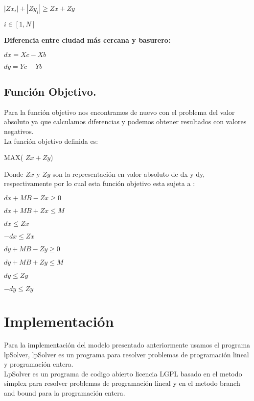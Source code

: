 \documentclass[10pt]{article}
\begin{document}
\begin{center}

 
  $ |Zx_i| + |Zy_i| \geq Zx + Zy $
  
   
   $i \in [1,N]$
  
  

\end{center}


\textbf{Diferencia entre ciudad  m\'as cercana y basurero: }\\

\begin{center}

 
  $ dx = Xc - Xb $
  
   
   $dy = Yc - Yb$
  
  

\end{center}


\subsection{Funci\'on Objetivo.}

Para la funci\'on objetivo nos encontramos de nuevo con el problema del valor absoluto ya que calculamos diferencias y podemos obtener resultados con valores negativos.\\

La función objetivo definida es: 

\begin{center}
      MAX( $Zx + Zy$)
\end{center}

Donde $Zx$ y $Zy$ son la representaci\'on en valor absoluto de dx y dy, respectivamente por lo cual esta funci\'on objetivo esta sujeta a : 

\begin{center}
$dx + MB - Zx \geq 0 $

$dx + MB + Zx \leq M $

$dx \leq Zx $

$-dx \leq Zx$

\end{center}


\begin{center}
$dy + MB - Zy \geq 0 $

$dy + MB + Zy \leq M $

$dy \leq Zy $

$-dy \leq Zy$

\end{center}

\section{Implementaci\'on}

Para la implementaci\'on del modelo presentado anteriormente usamos el programa lpSolver, lpSolver es un programa para resolver problemas de programación lineal y programación entera.\\

LpSolver es un programa de codigo abierto licencia LGPL basado en el metodo simplex para resolver problemas de programación lineal y en el metodo branch and bound para la programaci\'on entera.
\end{document}
